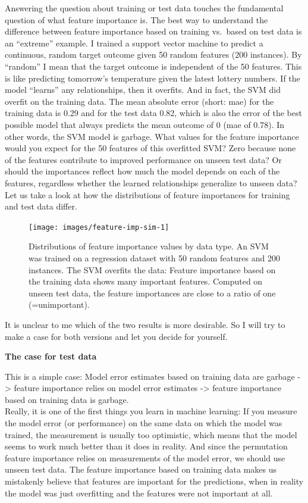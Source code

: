 \documentclass[
  12pt,
]{krantz}
\begin{document}
Answering the question about training or test data touches the fundamental question of what feature importance is.
The best way to understand the difference between feature importance based on training vs.~based on test data is an ``extreme'' example.
I trained a support vector machine to predict a continuous, random target outcome given 50 random features (200 instances).
By ``random'' I mean that the target outcome is independent of the 50 features.
This is like predicting tomorrow's temperature given the latest lottery numbers.
If the model ``learns'' any relationships, then it overfits.
And in fact, the SVM did overfit on the training data.
The mean absolute error (short: mae) for the training data is 0.29 and for the test data 0.82, which is also the error of the best possible model that always predicts the mean outcome of 0 (mae of 0.78).
In other words, the SVM model is garbage.
What values for the feature importance would you expect for the 50 features of this overfitted SVM?
Zero because none of the features contribute to improved performance on unseen test data?
Or should the importances reflect how much the model depends on each of the features, regardless whether the learned relationships generalize to unseen data?
Let us take a look at how the distributions of feature importances for training and test data differ.

\begin{figure}

{\centering \texttt{[image: images/feature-imp-sim-1]} 

}

\caption{Distributions of feature importance values by data type. An SVM was trained on a regression dataset with 50 random features and 200 instances. The SVM overfits the data: Feature importance based on the training data shows many important features. Computed on unseen test data, the feature importances are close to a ratio of one (=unimportant).}\label{fig:feature-imp-sim}
\end{figure}

It is unclear to me which of the two results is more desirable.
So I will try to make a case for both versions and let you decide for yourself.

\textbf{The case for test data}

This is a simple case:
Model error estimates based on training data are garbage -\textgreater{} feature importance relies on model error estimates -\textgreater{} feature importance based on training data is garbage.\\
Really, it is one of the first things you learn in machine learning:
If you measure the model error (or performance) on the same data on which the model was trained, the measurement is usually too optimistic, which means that the model seems to work much better than it does in reality.
And since the permutation feature importance relies on measurements of the model error, we should use unseen test data.
The feature importance based on training data makes us mistakenly believe that features are important for the predictions, when in reality the model was just overfitting and the features were not important at all.
\end{document}

